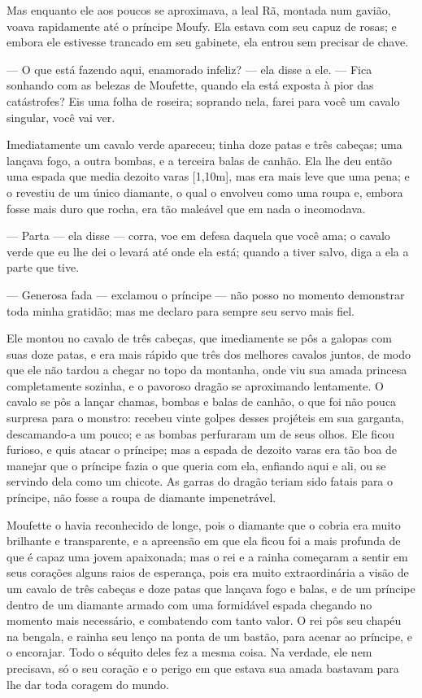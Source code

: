 Mas enquanto ele aos poucos se aproximava, a leal Rã, montada num
gavião, voava rapidamente até o príncipe Moufy. Ela estava com seu
capuz de rosas; e embora ele estivesse trancado em seu gabinete, ela
entrou sem precisar de chave. 

— O que está fazendo aqui, enamorado infeliz? — ela disse a ele. —
Fica sonhando com as belezas de Moufette, quando ela está exposta à
pior das catástrofes? Eis uma folha de roseira; soprando nela, farei
para você um cavalo singular, você vai ver. 

Imediatamente um cavalo verde apareceu; tinha doze patas e três
cabeças; uma lançava fogo, a outra bombas, e a terceira balas de
canhão. Ela lhe deu então uma espada que media dezoito varas [1,10m],
mas era mais leve que uma pena; e o revestiu de um único diamante, o
qual o envolveu como uma roupa e, embora fosse mais duro que rocha,
era tão maleável que em nada o incomodava. 

— Parta — ela disse — corra, voe em defesa daquela que você ama; o
cavalo verde que eu lhe dei o levará até onde ela está; quando a
tiver salvo, diga a ela a parte que tive. 

— Generosa fada — exclamou o príncipe — não posso no momento
demonstrar toda minha gratidão; mas me declaro para sempre seu servo
mais fiel.

Ele montou no cavalo de três cabeças, que imediamente se pôs a galopas
com suas doze patas, e era mais rápido que três dos melhores cavalos
juntos, de modo que ele não tardou a chegar no topo da montanha, onde
viu sua amada princesa completamente sozinha, e o pavoroso dragão se
aproximando lentamente. O cavalo se pôs a lançar chamas, bombas e
balas de canhão, o que foi não pouca surpresa para o monstro: recebeu
vinte golpes desses projéteis em sua garganta, descamando-a um pouco;
e as bombas perfuraram um de seus olhos. Ele ficou furioso, e quis
atacar o príncipe; mas a espada de dezoito varas era tão boa de
manejar que o príncipe fazia o que queria com ela, enfiando aqui e
ali, ou se servindo dela como um chicote. As garras do dragão teriam
sido fatais para o príncipe, não fosse a roupa de diamante
impenetrável. 

Moufette o havia reconhecido de longe, pois o diamante que o cobria
era muito brilhante e transparente, e a apreensão em que ela ficou
foi a mais profunda de que é capaz uma jovem apaixonada; mas o rei e
a rainha começaram a sentir em seus corações alguns raios de
esperança, pois era muito extraordinária a visão de um cavalo de três
cabeças e doze patas que lançava fogo e balas, e de um príncipe
dentro de um diamante armado com uma formidável espada chegando no
momento mais necessário, e combatendo com tanto valor. O rei pôs seu
chapéu na bengala, e rainha seu lenço na ponta de um bastão, para
acenar ao príncipe, e o encorajar. Todo o séquito deles fez a mesma
coisa. Na verdade, ele nem precisava, só o seu coração e o perigo em
que estava sua amada bastavam para lhe dar toda coragem do mundo. 


